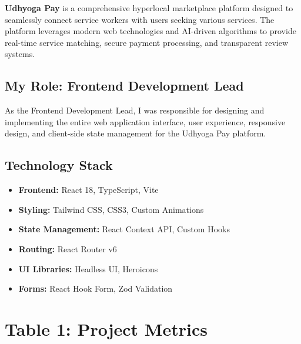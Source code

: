 \documentclass[12pt,a4paper]{article}
\begin{document}
\textbf{Udhyoga Pay} is a comprehensive hyperlocal marketplace platform designed to seamlessly connect service workers with users seeking various services. The platform leverages modern web technologies and AI-driven algorithms to provide real-time service matching, secure payment processing, and transparent review systems.

\subsection*{My Role: Frontend Development Lead}
As the Frontend Development Lead, I was responsible for designing and implementing the entire web application interface, user experience, responsive design, and client-side state management for the Udhyoga Pay platform.

\subsection*{Technology Stack}
\begin{itemize}[leftmargin=*]
    \item \textbf{Frontend:} React 18, TypeScript, Vite
    \item \textbf{Styling:} Tailwind CSS, CSS3, Custom Animations
    \item \textbf{State Management:} React Context API, Custom Hooks
    \item \textbf{Routing:} React Router v6
    \item \textbf{UI Libraries:} Headless UI, Heroicons
    \item \textbf{Forms:} React Hook Form, Zod Validation
\end{itemize}

\vspace{0.3cm}

\section*{Table 1: Project Metrics}
\end{document}
